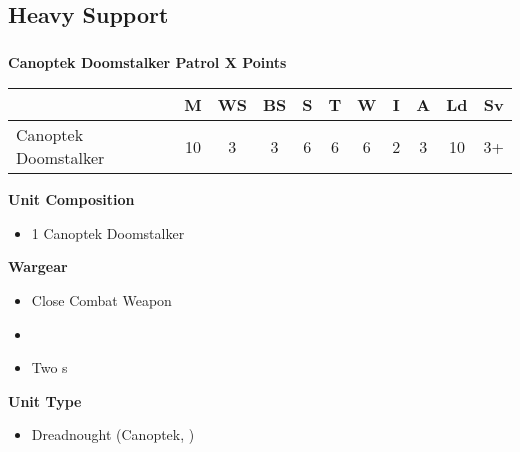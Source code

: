 \subsection{Heavy Support}

\newpage
\subsubsection[Canoptek Doomstalker Patrol]{}

\hspace{0.5em}
\begin{minipage}[t]{0.72\textwidth}
	{\large \textbf{Canoptek Doomstalker Patrol \dotfill X Points}}
	
	\begin{tabular}{m{165 pt} *{10}{c}}
		& M & WS & BS & S & T & W & I & A & Ld & Sv \\
		\hline
		Canoptek Doomstalker & 10 & 3 & 3 & 6 & 6 & 6 & 2 & 3 & 10 & 3+ \\
	\end{tabular}
	\small
	\begin{minipage}[t]{0.5\textwidth}
		\begin{flushleft}
			\vspace*{2em}
			\textbf{Unit Composition}
			\begin{itemize}
				\item 1 Canoptek Doomstalker
			\end{itemize}
			
			\textbf{Wargear}
			\begin{itemize}
				\item Close Combat Weapon
				\item {}
				\item Two s
			\end{itemize}
		\end{flushleft}
	\end{minipage}
	\begin{minipage}[t]{0.5\textwidth}
		\begin{flushleft}
			\vspace*{2em}
			\textbf{Unit Type}
			\begin{itemize}
				\item Dreadnought (Canoptek, \quickref{Living Metal})
			\end{itemize}
			

\end{flushleft}
\end{minipage}
\end{minipage}
